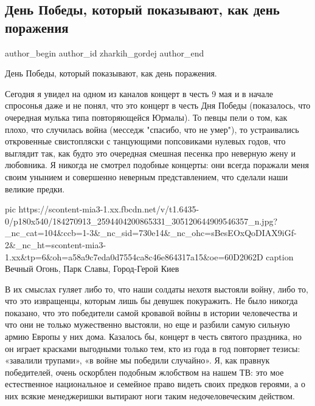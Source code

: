  
 
 
 
 
 
\subsection{День Победы, который показывают, как день поражения}
\label{sec:09_05_2021.fb.zharkih_gordej.1.den_pobedy_porazhenie}
\ifcmt
 author_begin
   author_id zharkih_gordej
 author_end
\fi

День Победы, который показывают, как день поражения.

Сегодня я увидел на одном из каналов концерт в честь 9 мая и в начале спросонья
даже и не понял, что это концерт в честь Дня Победы (показалось, что очередная
мулька типа повторяющейся Юрмалы). То певцы пели о том, как плохо, что
случилась война (месседж "спасибо, что не умер"), то устраивались откровенные
свистопляски с танцующими попсовиками нулевых годов, что выглядит так, как
будто это очередная смешная песенка про неверную жену и любовника. Я никогда не
смотрел подобные концерты: они всегда поражали меня своим унынием и совершенно
неверным представлением, что сделали наши великие предки. 

\ifcmt
  pic https://scontent-mia3-1.xx.fbcdn.net/v/t1.6435-0/p180x540/184270913_2594404200865331_305120644909546357_n.jpg?_nc_cat=104&ccb=1-3&_nc_sid=730e14&_nc_ohc=sBesEOxQoDIAX9iGf-2&_nc_ht=scontent-mia3-1.xx&tp=6&oh=a58a9c7eda0d7554ca8c46e864317a15&oe=60D2062D
	caption Вечный Огонь, Парк Славы, Город-Герой Киев
\fi

В их смыслах гуляет либо то, что наши солдаты нехотя выстояли войну, либо то,
что это извращенцы, которым лишь бы девушек покуражить. Не было никогда
показано, что это победители самой кровавой войны в истории человечества и что
они не только мужественно выстояли, но еще и разбили самую сильную армию Европы
у них дома. Казалось бы, концерт в честь святого праздника, но он играет
красками выгодными только тем, кто из года в год повторяет тезисы: «завалили
трупами», «в войне мы победили случайно». Я, как правнук победителей, очень
оскорблен подобным жлобством на нашем ТВ: это мое естественное национальное и
семейное право видеть своих предков героями, а о них всякие менеджеришки
вытирают ноги таким недочеловеческим действом. 

